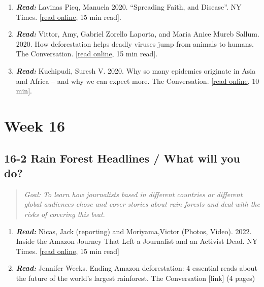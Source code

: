 \documentclass[
  10pt,
  letterpaper,
  oneside,
  open=any]{scrbook}
\begin{document}
\begin{enumerate}
\def\labelenumi{\arabic{enumi}.}
\item
  \textbf{\emph{Read:}} Lavinas Picq, Manuela 2020. ``Spreading Faith,
  and Disease''. NY Times.
  {[}\href{https://www.nytimes.com/2020/10/02/opinion/amazon-missionaries-tribes-disease.html}{read
  online}, 15 min read{]}.
\item
  \textbf{\emph{Read:}} Vittor, Amy, Gabriel Zorello Laporta, and Maria
  Anice Mureb Sallum. 2020. How deforestation helps deadly viruses jump
  from animals to humans. The Conversation.
  {[}\href{https://theconversation.com/how-deforestation-helps-deadly-viruses-jump-from-animals-to-humans-139645}{read
  online}, 15 min read{]}.
\item
  \textbf{\emph{Read:}} Kuchipudi, Suresh V. 2020. Why so many epidemics
  originate in Asia and Africa -- and why we can expect more. The
  Conversation.
  {[}\href{https://theconversation.com/why-so-many-epidemics-originate-in-asia-and-africa-and-why-we-can-expect-more-131657}{read
  online}, 10 min{]}.
\end{enumerate}

\section{Week 16}\label{week-16}

\subsection*{16-2 Rain Forest Headlines / What will you
do?}\label{rain-forest-headlines-what-will-you-do}

\begin{quote}
\emph{Goal: To learn how journalists based in different countries or
different global audiences chose and cover stories about rain forests
and deal with the risks of covering this beat}.
\end{quote}

\begin{enumerate}
\def\labelenumi{\arabic{enumi}.}
\item
  \textbf{\emph{Read:}} Nicas, Jack (reporting) and Moriyama,Victor
  (Photos, Video). 2022. Inside the Amazon Journey That Left a
  Journalist and an Activist Dead. NY Times.
  {[}\href{https://www.nytimes.com/interactive/2022/07/11/world/americas/amazon-murder-dom-phillips-bruno-pereira.html?smid=tw-nytimes&smtyp=cur}{read
  online}, 15 min read{]}
\item
  \textbf{\emph{Read:}} Jennifer Weeks. Ending Amazon deforestation: 4
  essential reads about the future of the world's largest rainforest.
  The Conversation {[}link{]} (4 pages)
\end{enumerate}
\end{document}
